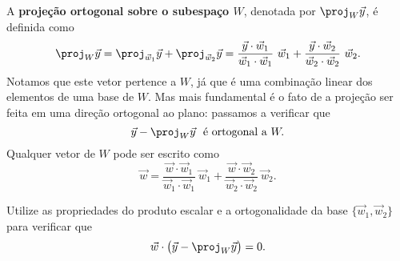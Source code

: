 A \textbf{projeção ortogonal sobre o subespaço $W$}, denotada por $\proj_W \vec{y}$, é definida como
\begin{equation}
\proj_W \vec{y} = \proj_{\vec{w}_1} \vec{y} + \proj_{\vec{w}_2} \vec{y} = \frac{\vec{y} \cdot \vec{w}_1}{\vec{w}_1 \cdot \vec{w}_1} \ \vec{w}_1 + \frac{\vec{y} \cdot \vec{w}_2}{\vec{w}_2 \cdot \vec{w}_2} \ \vec{w}_2.
\end{equation} Notamos que este vetor pertence a $W$, já que é uma combinação linear dos elementos de uma base de $W$. Mas mais fundamental é o fato de a projeção ser feita em uma direção ortogonal ao plano: passamos a verificar que
\begin{equation}
\vec{y} - \proj_W \vec{y} \ \text{ é ortogonal a }  W.
\end{equation} Qualquer vetor de $W$ pode ser escrito como
\begin{equation}
\vec{w} = \frac{\vec{w} \cdot \vec{w}_1}{\vec{w}_1 \cdot \vec{w}_1} \ \vec{w}_1 + \frac{\vec{w} \cdot \vec{w}_2}{\vec{w}_2 \cdot \vec{w}_2} \ \vec{w}_2.
\end{equation}

\begin{exer}\label{exercise:proj}
Utilize as propriedades do produto escalar e a ortogonalidade da base $\{\vec{w}_1, \vec{w}_2\}$ para verificar que
\begin{equation}
\vec{w} \cdot  \big( \vec{y} - \proj_W \vec{y} \big) = 0.
\end{equation}
\end{exer}

